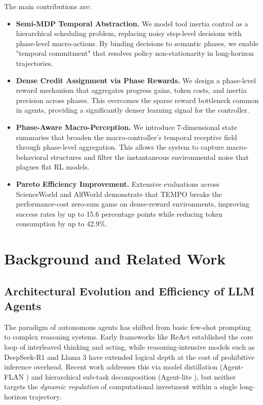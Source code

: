 \documentclass[runningheads]{llncs}
\begin{document}
The main contributions are:
\begin{itemize}
    \item \textbf{Semi-MDP Temporal Abstraction.} We model tool inertia control as a hierarchical scheduling problem, replacing noisy step-level decisions with phase-level macro-actions. By binding decisions to semantic phases, we enable "temporal commitment" that resolves policy non-stationarity in long-horizon trajectories.
    \item \textbf{Dense Credit Assignment via Phase Rewards.} We design a phase-level reward mechanism that aggregates progress gains, token costs, and inertia precision across phases. This overcomes the sparse reward bottleneck common in agents, providing a significantly denser learning signal for the controller.
    \item \textbf{Phase-Aware Macro-Perception.} We introduce 7-dimensional state summaries that broaden the macro-controller's temporal receptive field through phase-level aggregation. This allows the system to capture macro-behavioral structures and filter the instantaneous environmental noise that plagues flat RL models.
    \item \textbf{Pareto Efficiency Improvement.} Extensive evaluations across ScienceWorld and AlfWorld demonstrate that TEMPO breaks the performance-cost zero-sum game on dense-reward environments, improving success rates by up to 15.6 percentage points while reducing token consumption by up to 42.9\%.
\end{itemize}

\section{Background and Related Work}

\subsection{Architectural Evolution and Efficiency of LLM Agents}
The paradigm of autonomous agents has shifted from basic few-shot prompting to complex reasoning systems. Early frameworks like ReAct established the core loop of interleaved thinking and acting, while reasoning-intensive models such as DeepSeek-R1 and Llama 3 have extended logical depth at the cost of prohibitive inference overhead. Recent work addresses this via model distillation (Agent-FLAN \cite{agentflan}) and hierarchical sub-task decomposition (Agent-lite \cite{agentlite}), but neither targets the \emph{dynamic regulation} of computational investment within a single long-horizon trajectory.
\end{document}
